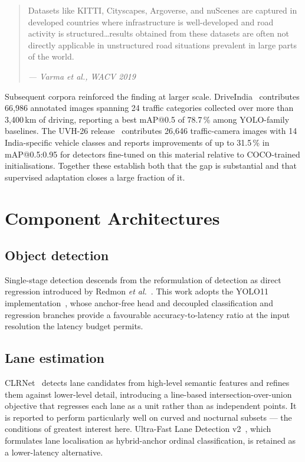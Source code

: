 \documentclass[11pt,a4paper]{report}
\begin{document}
\begin{quote}
\small
Datasets like KITTI, Cityscapes, Argoverse, and nuScenes are captured in
developed countries where infrastructure is well-developed and road activity is
structured\ldots results obtained from these datasets are often not directly
applicable in unstructured road situations prevalent in large parts of the
world.\par
\hfill\textit{— Varma et al., WACV 2019}
\end{quote}

Subsequent corpora reinforced the finding at larger scale.
DriveIndia~\cite{kumar2025driveindia} contributes 66{,}986 annotated images
spanning 24 traffic categories collected over more than 3{,}400\,km of driving,
reporting a best mAP@0.5 of 78.7\,\% among YOLO-family baselines. The UVH-26
release~\cite{iisc2025uvh26} contributes 26{,}646 traffic-camera images with 14
India-specific vehicle classes and reports improvements of up to 31.5\,\% in
mAP@0.5:0.95 for detectors fine-tuned on this material relative to COCO-trained
initialisations. Together these establish both that the gap is substantial and
that supervised adaptation closes a large fraction of it.

\section{Component Architectures}

\subsection{Object detection}

Single-stage detection descends from the reformulation of detection as direct
regression introduced by Redmon \textit{et al.}~\cite{redmon2016yolo}. This work
adopts the YOLO11 implementation~\cite{ultralytics2024yolo11}, whose anchor-free
head and decoupled classification and regression branches provide a favourable
accuracy-to-latency ratio at the input resolution the latency budget permits.

\subsection{Lane estimation}

CLRNet~\cite{zheng2022clrnet} detects lane candidates from high-level semantic
features and refines them against lower-level detail, introducing a line-based
intersection-over-union objective that regresses each lane as a unit rather than
as independent points. It is reported to perform particularly well on curved and
nocturnal subsets — the conditions of greatest interest here. Ultra-Fast Lane
Detection v2~\cite{qin2024ufldv2}, which formulates lane localisation as
hybrid-anchor ordinal classification, is retained as a lower-latency
alternative.
\end{document}
